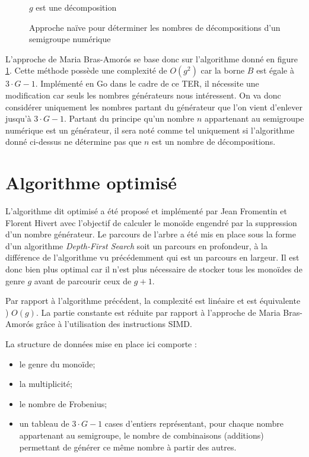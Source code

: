 \documentclass[12pt,a4paper]{report}
\begin{document}
\begin{figure}[h]
	\begin{algorithmic}
						\STATE $g$ est une décomposition
					\ENDIF
				\ENDFOR
			\ENDIF
		\ENDFOR
	\end{algorithmic}
	\caption{Approche naïve pour déterminer les nombres de décompositions d'un semigroupe numérique}
	\label{fig:nalg}
\end{figure}

L'approche de Maria Bras-Amorós se base donc sur l'algorithme donné en figure \ref{fig:nalg}. Cette méthode possède une complexité de $O(g^2)$ car la borne $B$ est égale à $3 \cdot G - 1$. Implémenté en Go dans le cadre de ce TER, il nécessite une modification car seuls les nombres générateurs nous intéressent. On va donc considérer uniquement les nombres partant du générateur que l'on vient d'enlever jusqu'à $3 \cdot G - 1$. Partant du principe qu'un nombre $n$ appartenant au semigroupe numérique est un générateur, il sera noté comme tel uniquement si l'algorithme donné ci-dessus ne détermine pas que $n$ est un nombre de décompositions.

\section{Algorithme optimisé}
L'algorithme dit optimisé a été proposé et implémenté par Jean Fromentin et Florent Hivert \cite{exploring-ns} avec l'objectif de calculer le monoïde engendré par la suppression d'un nombre générateur. Le parcours de l'arbre a été mis en place sous la forme d'un algorithme \emph{Depth-First Search} soit un parcours en profondeur, à la différence de l'algorithme vu précédemment qui est un parcours en largeur. Il est donc bien plus optimal car il n'est plus nécessaire de stocker tous les monoïdes de genre $g$ avant de parcourir ceux de $g + 1$.

Par rapport à l'algorithme précédent, la complexité est linéaire et est équivalente ) $O(g)$. La partie constante est réduite par rapport à l'approche de Maria Bras-Amorós grâce à l'utilisation des instructions SIMD.

La structure de données mise en place ici comporte :
\begin{itemize}
	\item	le genre du monoïde;
	\item	la multiplicité;
	\item	le nombre de Frobenius;
	\item	un tableau de $3 \cdot G - 1$ cases d'entiers représentant, pour chaque nombre appartenant au semigroupe, le nombre de combinaisons (additions) permettant de générer ce même nombre à partir des autres.
\end{itemize}
\end{document}
